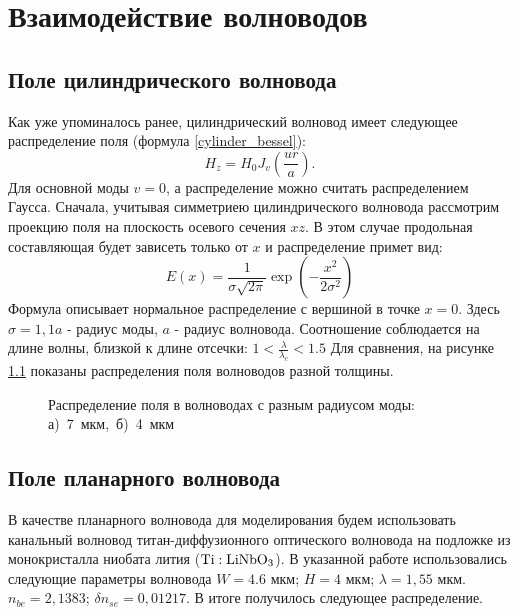 \chapter{Взаимодействие волноводов}
\label{coupling}
\section{Поле цилиндрического волновода}
Как уже упоминалось ранее, цилиндрический волновод имеет следующее распределение поля (формула \ref{cylinder_bessel}):
$$
	H_z = H_0 J_v (\frac{ur}{a}).
$$
Для основной моды $v = 0$, а распределение можно считать распределением Гаусса. Сначала, учитывая  симметриею цилиндрического волновода рассмотрим проекцию поля на плоскость осевого сечения $xz$. В этом случае продольная составляющая будет зависеть только от $x$ и распределение примет вид:
\begin{equation}
  \label{gauss}
  E(x)=\frac{1}{\sigma\sqrt{2\pi}}\exp\left(-\frac{x^2}{2\sigma^2}\right)
\end{equation}
Формула описывает нормальное распределение с вершиной в точке $x=0$.
Здесь $\sigma = 1,1a$ - радиус моды, $a$ - радиус волновода. Соотношение соблюдается на длине волны, близкой к длине отсечки: $1 < \frac{\lambda}{\lambda_c} < 1.5$
Для сравнения, на рисунке \ref{diameter} показаны распределения поля волноводов разной толщины.

\begin{figure}[h!]
	\begin{minipage}[h]{0.49\linewidth}
	\end{minipage}
	\hfill
	\begin{minipage}[h]{0.49\linewidth}
	\end{minipage}
	\caption{Распределение поля в волноводах с разным радиусом моды: \mbox{а) 7~мкм, б) 4~мкм}}
	\label{diameter}
\end{figure}

\section{Поле планарного волновода}
В качестве планарного волновода для моделирования будем использовать канальный волновод титан-диффузионного оптического волновода на подложке из монокристалла ниобата лития ($\rm Ti:LiNbO_3$)\cite{vlada}. В указанной работе использовались следующие параметры волновода $W=4.6$ мкм; $H=4$ мкм; $\lambda =1,55$ мкм. $n_{be}=2,1383$; $\delta n_{se}=0,01217$. В итоге получилось следующее распределение.

